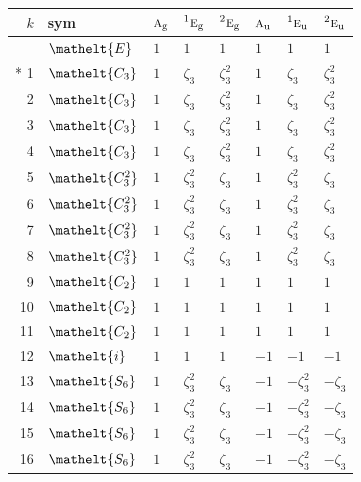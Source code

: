 \documentclass[10pt,a4paper]{article}
\numberwithin{equation}{section}
\newcommand{\eltfont}[1]{{\let\sigma\eltsigma\mathelt{#1}}}
\newcommand{\irr}[1]{\text{\normalfont\scshape #1}}
\newcommand{\conjpair}[1]{{}^{#1}}
\newcommand{\cls}[1]{\eltfont{#1}}
\newcommand{\ptag}[1]{\mathrm{#1}}
\newcommand{\rootunity}[1]{\zeta_{#1}}
\begin{document}
{\small\setlength{\tabcolsep}{4pt}
\begin{longtable}{@{}rlllllll@{}}\toprule
$k$ & sym & $\irr{a}_{\ptag{g}}$ & $\conjpair{1}\irr{e}_{\ptag{g}}$ & $\conjpair{2}\irr{e}_{\ptag{g}}$ & $\irr{a}_{\ptag{u}}$ & $\conjpair{1}\irr{e}_{\ptag{u}}$ & $\conjpair{2}\irr{e}_{\ptag{u}}$\\\midrule\endhead
\bottomrule\endfoot\endlastfoot
0 & $\cls{E}$ & $1$ & $1$ & $1$ & $1$ & $1$ & $1$\\*
1 & $\cls{C_{3}}$ & $1$ & $\rootunity{3}$ & $\rootunity{3}^{2}$ & $1$ & $\rootunity{3}$ & $\rootunity{3}^{2}$\\
2 & $\cls{C_{3}}$ & $1$ & $\rootunity{3}$ & $\rootunity{3}^{2}$ & $1$ & $\rootunity{3}$ & $\rootunity{3}^{2}$\\
3 & $\cls{C_{3}}$ & $1$ & $\rootunity{3}$ & $\rootunity{3}^{2}$ & $1$ & $\rootunity{3}$ & $\rootunity{3}^{2}$\\
4 & $\cls{C_{3}}$ & $1$ & $\rootunity{3}$ & $\rootunity{3}^{2}$ & $1$ & $\rootunity{3}$ & $\rootunity{3}^{2}$\\
5 & $\cls{C_{3}^{2}}$ & $1$ & $\rootunity{3}^{2}$ & $\rootunity{3}$ & $1$ & $\rootunity{3}^{2}$ & $\rootunity{3}$\\
6 & $\cls{C_{3}^{2}}$ & $1$ & $\rootunity{3}^{2}$ & $\rootunity{3}$ & $1$ & $\rootunity{3}^{2}$ & $\rootunity{3}$\\
7 & $\cls{C_{3}^{2}}$ & $1$ & $\rootunity{3}^{2}$ & $\rootunity{3}$ & $1$ & $\rootunity{3}^{2}$ & $\rootunity{3}$\\
8 & $\cls{C_{3}^{2}}$ & $1$ & $\rootunity{3}^{2}$ & $\rootunity{3}$ & $1$ & $\rootunity{3}^{2}$ & $\rootunity{3}$\\
9 & $\cls{C_{2}}$ & $1$ & $1$ & $1$ & $1$ & $1$ & $1$\\
10 & $\cls{C_{2}}$ & $1$ & $1$ & $1$ & $1$ & $1$ & $1$\\
11 & $\cls{C_{2}}$ & $1$ & $1$ & $1$ & $1$ & $1$ & $1$\\
12 & $\cls{i}$ & $1$ & $1$ & $1$ & $-1$ & $-1$ & $-1$\\
13 & $\cls{S_{6}}$ & $1$ & $\rootunity{3}^{2}$ & $\rootunity{3}$ & $-1$ & $-\rootunity{3}^{2}$ & $-\rootunity{3}$\\
14 & $\cls{S_{6}}$ & $1$ & $\rootunity{3}^{2}$ & $\rootunity{3}$ & $-1$ & $-\rootunity{3}^{2}$ & $-\rootunity{3}$\\
15 & $\cls{S_{6}}$ & $1$ & $\rootunity{3}^{2}$ & $\rootunity{3}$ & $-1$ & $-\rootunity{3}^{2}$ & $-\rootunity{3}$\\
16 & $\cls{S_{6}}$ & $1$ & $\rootunity{3}^{2}$ & $\rootunity{3}$ & $-1$ & $-\rootunity{3}^{2}$ & $-\rootunity{3}$\\

\end{longtable}}
\end{document}
